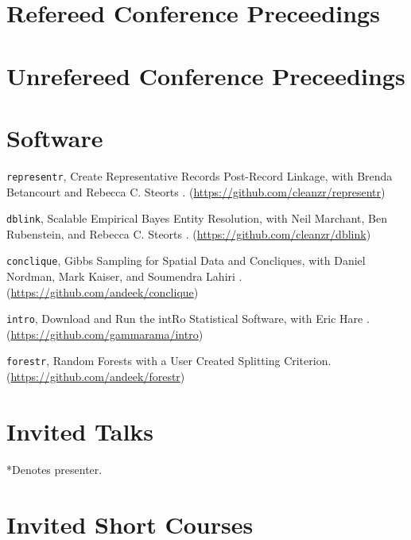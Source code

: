 \documentclass[margin,line]{res}
\begin{document}
\begin{resume}
\printbibliography[keyword=inprep, heading=none]

\section{\sc Refereed Conference Preceedings}
\printbibliography[keyword=conf-ref, heading=none, resetnumbers=false]

\section{\sc Unrefereed Conference Preceedings}
\printbibliography[keyword=conf-unref, heading=none, resetnumbers=false]

\section{\sc Software}

\begin{enumerate}[label={[\arabic*]}, labelsep=.35cm]
\item \texttt{representr}, Create Representative Records Post-Record Linkage, with Brenda Betancourt and Rebecca C. Steorts \cite{kaplan2018posterior}. (\url{https://github.com/cleanzr/representr})
\item \texttt{dblink}, Scalable Empirical Bayes Entity Resolution, with Neil Marchant, Ben Rubenstein, and Rebecca C. Steorts \cite{marchant2019d}. (\url{https://github.com/cleanzr/dblink})
\item \texttt{conclique}, Gibbs Sampling for Spatial Data and Concliques, with Daniel Nordman, Mark Kaiser, and Soumendra Lahiri \cite{kaplan2016geometrically}. (\url{https://github.com/andeek/conclique})
\item \texttt{intro}, Download and Run the intRo Statistical Software, with Eric Hare \cite{hare2017introductory}. (\url{https://github.com/gammarama/intro})
\item \texttt{forestr}, Random Forests with a User Created Splitting Criterion. (\url{https://github.com/andeek/forestr})
\end{enumerate}

\section{\sc Invited Talks}
*Denotes presenter.\\
\printbibliography[keyword=talk-invited, heading=none, resetnumbers=true]

\section{\sc Invited Short Courses}


\end{resume}
\end{document}

